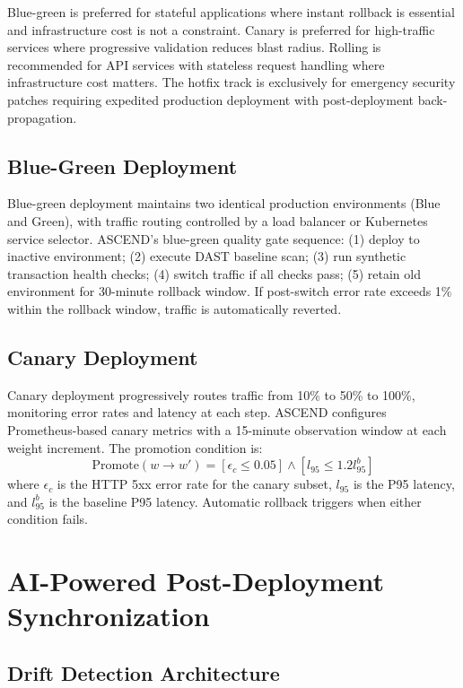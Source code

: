 \documentclass[journal]{IEEEtran}
\begin{document}
Blue-green is preferred for stateful applications where instant rollback is essential and infrastructure cost is not a constraint. Canary is preferred for high-traffic services where progressive validation reduces blast radius. Rolling is recommended for API services with stateless request handling where infrastructure cost matters. The hotfix track is exclusively for emergency security patches requiring expedited production deployment with post-deployment back-propagation.

\subsection{Blue-Green Deployment}

Blue-green deployment maintains two identical production environments (Blue and Green), with traffic routing controlled by a load balancer or Kubernetes service selector. ASCEND's blue-green quality gate sequence: (1) deploy to inactive environment; (2) execute DAST baseline scan; (3) run synthetic transaction health checks; (4) switch traffic if all checks pass; (5) retain old environment for 30-minute rollback window. If post-switch error rate exceeds 1\% within the rollback window, traffic is automatically reverted.

\subsection{Canary Deployment}

Canary deployment progressively routes traffic from 10\% to 50\% to 100\%, monitoring error rates and latency at each step. ASCEND configures Prometheus-based canary metrics with a 15-minute observation window at each weight increment. The promotion condition is:
\begin{equation}
\text{Promote}(w \!\to\! w') = [\epsilon_c \!\leq\! 0.05] \wedge [l_{95} \!\leq\! 1.2 l_{95}^{b}]
\label{eq:canary}
\end{equation}
where $\epsilon_c$ is the HTTP 5xx error rate for the canary subset, $l_{95}$ is the P95 latency, and $l_{95}^{b}$ is the baseline P95 latency. Automatic rollback triggers when either condition fails.

\section{AI-Powered Post-Deployment Synchronization}
\label{sec:ai}

\subsection{Drift Detection Architecture}
\end{document}
